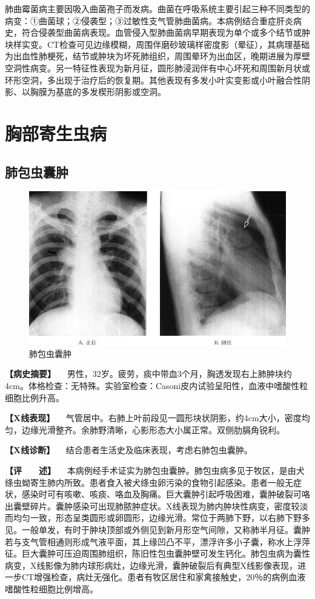 肺曲霉菌病主要因吸入曲菌孢子而发病。曲菌在呼吸系统主要引起三种不同类型的病变：①曲菌球；②侵袭型；③过敏性支气管肺曲菌病。本病例结合重症肝炎病史，符合侵袭型曲菌病表现。血管侵入型肺曲菌病早期表现为单个或多个结节或肿块样实变。CT检查可见边缘模糊，周围伴磨砂玻璃样密度影（晕征），其病理基础为出血性肺梗死，结节或肿块为坏死肺组织，周围晕环为出血区，晚期进展为厚壁空洞性病变。另一特征性表现为新月征，圆形肺浸润伴有中心坏死和周围新月状或环形空洞，多出现于治疗后的恢复期。其他表现有多发小叶实变影或小叶融合性阴影、以胸膜为基底的多发楔形阴影或空洞。

\section{胸部寄生虫病}

\subsection{肺包虫囊肿}

\begin{figure}[!htbp]
 \centering
 \includegraphics{./images/Image00162.jpg}
 \captionsetup{justification=centering}
 \caption{肺包虫囊肿}
 \label{fig3-7-1}
  \end{figure} 

\textbf{【病史摘要】}
　男性，32岁。疲劳，痰中带血3个月，胸透发现右上肺肿块约4cm。体格检查：无特殊。实验室检查：Casoni皮内试验呈阳性，血液中嗜酸性粒细胞比例升高。

\textbf{【X线表现】}
　气管居中。右肺上叶前段见一圆形块状阴影，约4cm大小，密度均匀，边缘光滑整齐。余肺野清晰，心影形态大小属正常。双侧肋膈角锐利。

\textbf{【X线诊断】} 　结合患者生活史及临床表现，考虑右肺包虫囊肿。

\textbf{【评　　述】}
　本病例经手术证实为肺包虫囊肿。肺包虫病多见于牧区，是由犬绦虫蚴寄生肺内所致。患者食入被犬绦虫卵污染的食物引起感染。患者一般无症状，感染时可有咳嗽、咳痰、咯血及胸痛。巨大囊肿引起呼吸困难，囊肿破裂可咯出囊壁碎片。囊肿感染可出现肺脓肿症状。X线表现为肺内肿块性病变，密度较淡而均匀一致，形态呈类圆形或卵圆形，边缘光滑。常位于两肺下野，以右肺下野多见。一般单发，有时于肿块顶部或外侧见到新月形空气间隙，又称肺半月征。囊肿若与支气管相通则形成气液平面，其上缘凹凸不平，漂浮许多小子囊，称水上浮萍征。巨大囊肿可压迫周围肺组织，陈旧性包虫囊肿壁可发生钙化。肺包虫病为囊性病变，X线影像为肺内球形病灶，边缘光滑，囊肿破裂后有典型X线影像表现，进一步CT增强检查，病灶无强化。患者有牧区居住和家禽接触史，20％的病例血液嗜酸性粒细胞比例增高。

